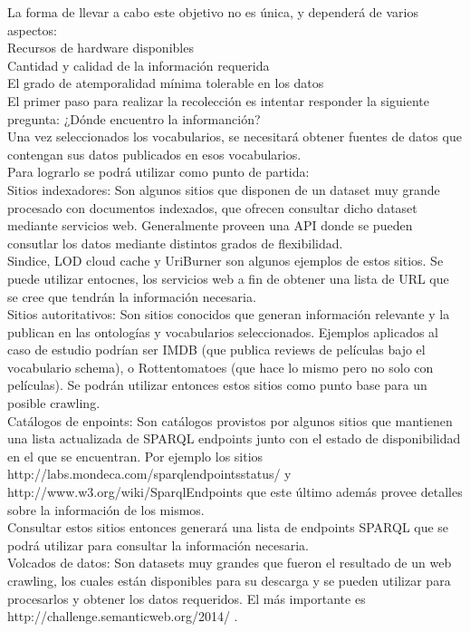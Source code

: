 La forma de llevar a cabo este objetivo no es única, y dependerá de varios aspectos:\\
Recursos de hardware disponibles\\
Cantidad y calidad de la información requerida\\
El grado de atemporalidad mínima tolerable en los datos\\
El primer paso para realizar la recolección es intentar responder la siguiente pregunta: ¿Dónde encuentro la informanción?\\
Una vez seleccionados los vocabularios, se necesitará obtener fuentes de datos que contengan sus datos publicados en esos vocabularios.\\ 
Para lograrlo se podrá utilizar como punto de partida:\\
Sitios indexadores: Son algunos sitios que disponen de un dataset muy grande procesado con documentos indexados, que ofrecen consultar dicho 
dataset mediante servicios web. Generalmente proveen una API donde se pueden consutlar los datos mediante distintos grados de flexibilidad.\\
Sindice, LOD cloud cache y UriBurner son algunos ejemplos de estos sitios. Se puede utilizar entocnes, los servicios web a fin
de obtener una lista de URL que se cree que tendrán la información necesaria.\\
Sitios autoritativos: Son sitios conocidos que generan información relevante y la publican en las ontologías y vocabularios 
seleccionados. Ejemplos aplicados al caso de estudio podrían ser IMDB (que publica reviews de películas bajo el vocabulario schema), o Rottentomatoes
(que hace lo mismo pero no solo con películas). Se podrán utilizar entonces estos sitios como punto base para un posible crawling.\\
Catálogos de enpoints: Son catálogos provistos por algunos sitios que mantienen una lista actualizada de SPARQL endpoints 
junto con el estado de disponibilidad en el que se encuentran. Por ejemplo los sitios http://labs.mondeca.com/sparqlendpointsstatus/ y 
http://www.w3.org/wiki/SparqlEndpoints que este último además provee detalles sobre la información de los mismos.\\
Consultar estos sitios entonces generará una lista de endpoints SPARQL que se podrá utilizar para consultar la información necesaria.\\
Volcados de datos: Son datasets muy grandes que fueron el resultado de un web crawling, los cuales están disponibles para su descarga 
y se pueden utilizar para procesarlos y obtener los datos requeridos. El más importante es http://challenge.semanticweb.org/2014/ .\\